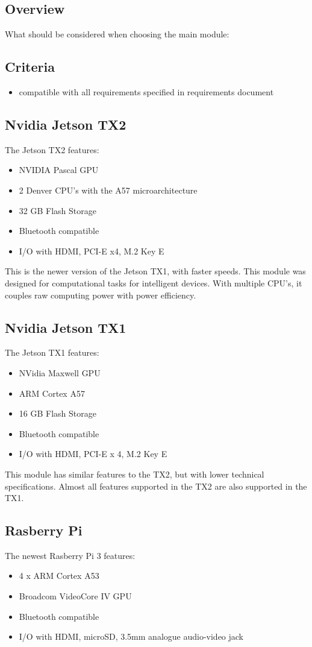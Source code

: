 \documentclass[onecolumn, draftclsnofoot,10pt, compsoc]{IEEEtran}
\begin{document}
\subsection{Overview}
What should be considered when choosing the main module:
\subsection{Criteria}
\begin{itemize}
    \item compatible with all requirements specified in requirements document
\end{itemize}

\subsection{Nvidia Jetson TX2}
The Jetson TX2 features:
\begin{itemize}
    \item NVIDIA Pascal GPU
    \item 2 Denver CPU's with the A57 microarchitecture
    \item 32 GB Flash Storage
    \item Bluetooth compatible
    \item I/O with HDMI, PCI-E x4, M.2 Key E
\end{itemize}
This is the newer version of the Jetson TX1, with faster speeds. This module was designed for computational tasks for intelligent devices. With multiple CPU's, it couples raw computing power with power efficiency. 
~\cite{tx2:specs}

\subsection{Nvidia Jetson TX1}
The Jetson TX1 features:
\begin{itemize}
    \item NVidia Maxwell GPU
    \item ARM Cortex A57
    \item 16 GB Flash Storage
    \item Bluetooth compatible
    \item I/O with HDMI, PCI-E x 4, M.2 Key E
\end{itemize}
This module has similar features to the TX2, but with lower technical specifications. Almost all features supported in the TX2 are also supported in the TX1.
~\cite{tx1:specs}

\subsection{Rasberry Pi}
The newest Rasberry Pi 3 features:
\begin{itemize}
    \item 4 x ARM Cortex A53
    \item Broadcom VideoCore IV GPU
    \item Bluetooth compatible
    \item I/O with HDMI, microSD, 3.5mm analogue audio-video jack
\end{itemize}
~\cite{rasberry:specs}
\end{document}
